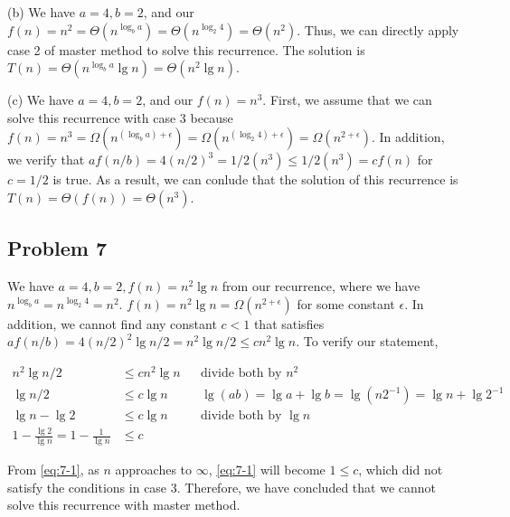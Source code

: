 \documentclass[a4paper]{article}
\makeatletter
\newenvironment{solution}
  {\begin{proof}[Solution]}
  {\end{proof}}
\renewenvironment{proof}[1][\proofname]{%
  \par\pushQED{\qed}\normalfont%
  \topsep6\p@\@plus6\p@\relax
  \trivlist\item[\hskip\labelsep\bfseries#1\@addpunct{.}]%
  \ignorespaces
}{%
  \popQED\endtrivlist\@endpefalse
}
\makeatother
\begin{document}
\begin{solution}
  (b) We have $a = 4, b = 2$, and our $f(n) = n^2 = \Theta(n^{\log_{b}a}) = \Theta(n^{\log_{2}4}) = \Theta(n^2)$. Thus, we can directly apply case 2 of master method to solve this recurrence. The solution is $T(n) = \Theta(n^{\log_{b}a}\lg n) = \Theta(n^2\lg n)$.
\end{solution}

\begin{solution}
  (c) We have $a = 4, b = 2$, and our $f(n) = n^3$. First, we assume that we can solve this recurrence with case 3 because $f(n) = n^3 = \Omega(n^{(\log_{b}a) + \epsilon}) = \Omega(n^{(\log_{2}4) + \epsilon}) = \Omega(n^{2 + \epsilon})$. In addition, we verify that $af(n/b) = 4(n/2)^3 = 1/2(n^3) \le 1/2(n^3) = cf(n)$ for $c = 1/2$ is true. As a result, we can conlude that the solution of this recurrence is $T(n) = \Theta(f(n)) = \Theta(n^3)$.
\end{solution}

\subsection*{Problem 7}

\begin{solution}
  We have $a = 4, b = 2, f(n) = n^2\lg n$ from our recurrence, where we have $n^{\log_{b}a} = n^{\log_{2}4} = n^2$. $f(n) = n^2\lg n= \Omega({n^{2 + \epsilon}})$ for some constant $\epsilon$. In addition, we cannot find any constant $c < 1$ that satisfies $af(n/b) = 4(n/2)^2\lg n/2  = n^2\lg n/2 \le cn^2 \lg n$. To verify our statement,

  \begin{align}
    n^2\lg n/2 &\le cn^2 \lg n && \text{divide both by $n^2$}\nonumber\\
    \lg n/2 &\le c\lg n && \lg(ab) = \lg a + \lg b = \lg(n2^{-1}) = \lg n + \lg2^{-1}\nonumber\\
    \lg n - \lg 2 &\le c\lg n && \text{divide both by $\lg n$}\nonumber\\
    1 - \frac{\lg 2}{\lg n} = 1 - \frac{1}{\lg n}&\le c \label{eq:7-1}
  \end{align}

  From \eqref{eq:7-1}, as $n$ approaches to $\infty$, \eqref{eq:7-1} will become $1 \le c$, which did not satisfy the conditions in case 3. Therefore, we have concluded that we cannot solve this recurrence with master method.
\end{solution}
\setcounter{equation}{0}
\end{document}
